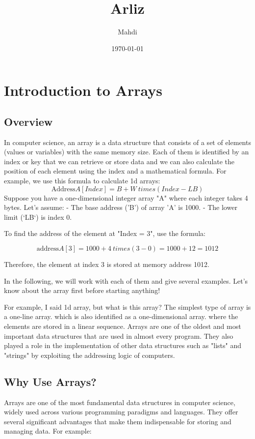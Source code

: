 \documentclass{book}
\title{{\Huge Arliz}}
\author{{\LARGE Mahdi}}
\date{{\large \today}}
\begin{document}
	
	\maketitle
	\tableofcontents
	
	\chapter{Introduction to Arrays}
	
	\section{Overview}
In computer science, an array is a data structure that consists of a set of elements (values ​​or variables) with the same memory size. Each of them is identified by an index or key that we can retrieve or store data and we can also calculate the position of each element using the index and a mathematical formula.
For example, we use this formula to calculate 1d arrays:
\[\text{Address} A[Index] = B + W \ times (Index - LB)\]
Suppose you have a one-dimensional integer array "A" where each integer takes 4 bytes. Let's assume:
- The base address ('B') of array 'A' is 1000.
- The lower limit (`LB`) is index 0.

To find the address of the element at "Index = 3", use the formula:

\[\text{address} A[3] = 1000 + 4 \ times (3 - 0) = 1000 + 12 = 1012\]

Therefore, the element at index 3 is stored at memory address 1012.

In the following, we will work with each of them and give several examples. Let's know about the array first before starting anything!

For example, I said 1d array, but what is this array?
The simplest type of array is a one-line array. which is also identified as a one-dimensional array. where the elements are stored in a linear sequence. Arrays are one of the oldest and most important data structures that are used in almost every program. They also played a role in the implementation of other data structures such as "lists" and "strings" by exploiting the addressing logic of computers.

\section{Why Use Arrays?}

Arrays are one of the most fundamental data structures in computer science, widely used across various programming paradigms and languages. They offer several significant advantages that make them indispensable for storing and managing data.  For example:
\end{document}
